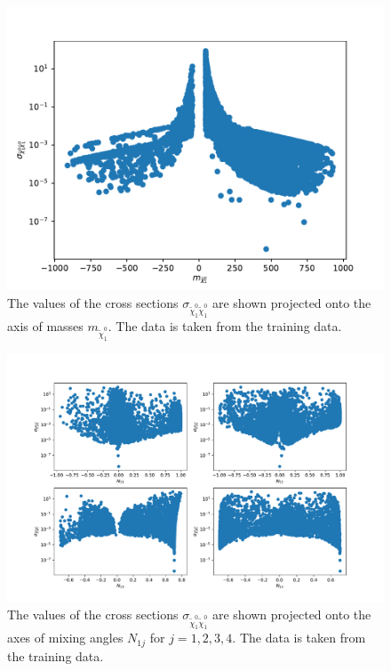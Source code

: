 \begin{figure}[h!]
    \centering
    \includegraphics[scale=0.7]{figures/dataset/masses.pdf}
    \caption{The values of the cross sections $\sigma_{\tilde{\chi}_1^0 \tilde{\chi}_1^0}$ are shown projected onto the axis of masses $m_{\tilde{\chi}_1^0}$. The data is taken from the training data.
    }\label{fig:dataset_masses}
\end{figure}


\begin{figure}[h!]
    \centering
    \includegraphics[scale=0.5]{figures/dataset/mixing_angles.pdf}
    \caption{The values of the cross sections $\sigma_{\tilde{\chi}_1^0 \tilde{\chi}_1^0}$ are shown projected onto the axes of mixing angles $N_{1j}$ for $j = 1, 2, 3, 4$. The data is taken from the training data.
    }\label{fig:dataset_mixing_angles}
\end{figure}


